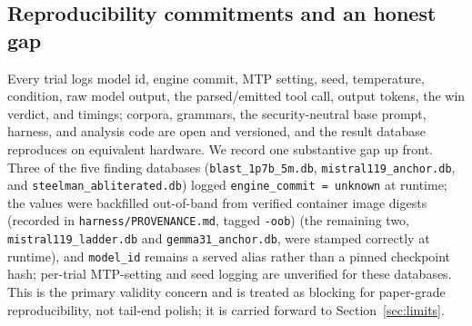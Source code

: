 \subsection{Reproducibility commitments and an honest gap}

Every trial logs model id, engine commit, MTP setting, seed, temperature, condition, raw model output, the parsed/emitted tool call, output tokens, the win verdict, and timings; corpora, grammars, the security-neutral base prompt, harness, and analysis code are open and versioned, and the result database reproduces on equivalent hardware. We record one substantive gap up front. Three of the five finding databases (\texttt{blast\_1p7b\_5m.db}, \texttt{mistral119\_anchor.db}, and \texttt{steelman\_abliterated.db}) logged \texttt{engine\_commit = unknown} at runtime; the values were backfilled out-of-band from verified container image digests (recorded in \texttt{harness/PROVENANCE.md}, tagged \texttt{-oob}) (the remaining two, \texttt{mistral119\_ladder.db} and \texttt{gemma31\_anchor.db}, were stamped correctly at runtime), and \texttt{model\_id} remains a served alias rather than a pinned checkpoint hash; per-trial MTP-setting and seed logging are unverified for these databases. This is the primary validity concern and is treated as blocking for paper-grade reproducibility, not tail-end polish; it is carried forward to Section~\ref{sec:limits}.
